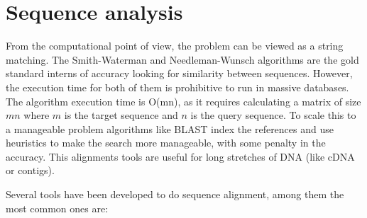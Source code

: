 \section{Sequence analysis}


From the computational point of view, the problem can be viewed as a string matching. The Smith-Waterman \cite{Smith1981} and Needleman-Wunsch\cite{Needleman1970} algorithms are the gold standard interns of accuracy looking for similarity between sequences. However, the execution time for both of them is prohibitive to run in massive databases. The algorithm execution time is O(mn), as it requires calculating a matrix of size $mn$ where $m$ is the target sequence and $n$ is the query sequence.  To scale this to a manageable problem algorithms like BLAST index the references and use heuristics to make the search more manageable, with some penalty in the accuracy. This alignments tools are useful for long stretches of DNA (like cDNA or contigs)\cite{Altschul1990}.

Several tools have been developed to do sequence alignment, among them the most common ones are:

